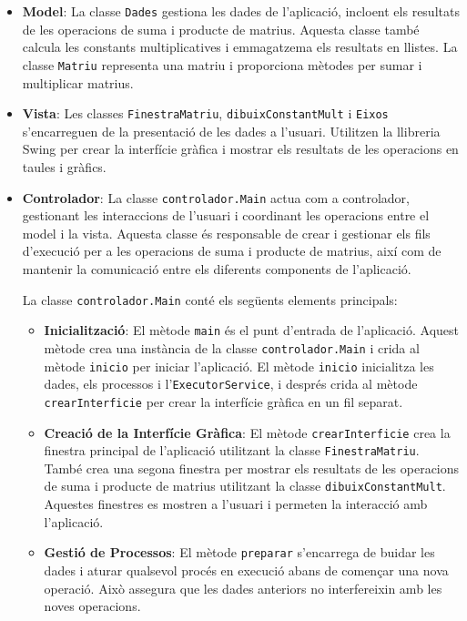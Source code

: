 \documentclass{ieeetj}
\begin{document}
\begin{itemize}
    \item \textbf{Model}: La classe \texttt{Dades} gestiona les dades de l'aplicació, incloent els resultats de les operacions de suma i producte de matrius. Aquesta classe també calcula les constants multiplicatives i emmagatzema els resultats en llistes. La classe \texttt{Matriu} representa una matriu i proporciona mètodes per sumar i multiplicar matrius.
    \item \textbf{Vista}: Les classes \texttt{FinestraMatriu}, \texttt{dibuixConstantMult} i \texttt{Eixos} s'encarreguen de la presentació de les dades a l'usuari. Utilitzen la llibreria Swing per crear la interfície gràfica i mostrar els resultats de les operacions en taules i gràfics.
    \item \textbf{Controlador}: La classe \texttt{controlador.Main} actua com a controlador, gestionant les interaccions de l'usuari i coordinant les operacions entre el model i la vista. Aquesta classe és responsable de crear i gestionar els fils d'execució per a les operacions de suma i producte de matrius, així com de mantenir la comunicació entre els diferents components de l'aplicació.

La classe \texttt{controlador.Main} conté els següents elements principals:

\begin{itemize}
    \item \textbf{Inicialització}: El mètode \texttt{main} és el punt d'entrada de l'aplicació. Aquest mètode crea una instància de la classe \texttt{controlador.Main} i crida al mètode \texttt{inicio} per iniciar l'aplicació. El mètode \texttt{inicio} inicialitza les dades, els processos i l'\texttt{ExecutorService}, i després crida al mètode \texttt{crearInterficie} per crear la interfície gràfica en un fil separat.
    
    \item \textbf{Creació de la Interfície Gràfica}: El mètode \texttt{crearInterficie} crea la finestra principal de l'aplicació utilitzant la classe \texttt{FinestraMatriu}. També crea una segona finestra per mostrar els resultats de les operacions de suma i producte de matrius utilitzant la classe \texttt{dibuixConstantMult}. Aquestes finestres es mostren a l'usuari i permeten la interacció amb l'aplicació.
    
    \item \textbf{Gestió de Processos}: El mètode \texttt{preparar} s'encarrega de buidar les dades i aturar qualsevol procés en execució abans de començar una nova operació. Això assegura que les dades anteriors no interfereixin amb les noves operacions.
    

\end{itemize}
\end{itemize}
\end{document}
